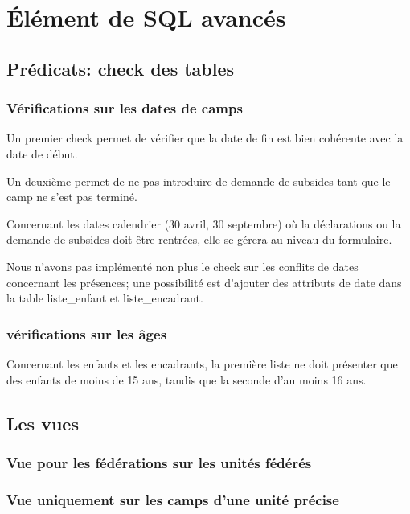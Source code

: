 \section{Élément de SQL avancés}
\subsection{Prédicats: check des tables}
\subsubsection{Vérifications sur les dates de camps}
Un premier check permet de vérifier que la date de fin est bien cohérente avec la date de début.


Un deuxième permet de ne pas introduire de demande de subsides tant que le camp ne s'est pas terminé. 



Concernant les dates calendrier (30 avril, 30 septembre) où la déclarations ou la demande de subsides doit être rentrées, elle se gérera au niveau du formulaire. 

Nous n'avons pas implémenté non plus le check sur les conflits de dates concernant les présences; une possibilité est d'ajouter des attributs de date dans la table liste\_enfant et liste\_encadrant.

\subsubsection{vérifications sur les âges}
Concernant les enfants et les encadrants, la première liste ne doit présenter que des enfants de moins de 15 ans, tandis que la seconde d'au moins 16 ans.



\subsection{Les vues}

\subsubsection{Vue pour les fédérations sur les unités fédérés}




\subsubsection{Vue uniquement sur les camps d'une unité précise}



